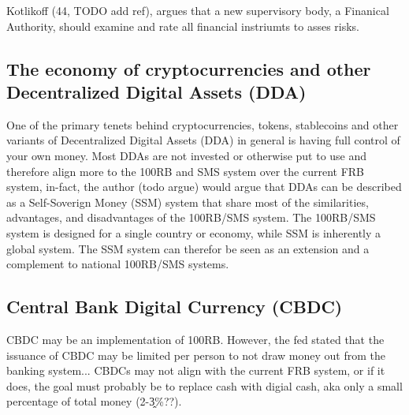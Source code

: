 Kotlikoff (44, TODO add ref), argues that a new supervisory body, a Finanical Authority, should examine and rate all financial instriumts to asses risks. 

\subsection{The economy of cryptocurrencies and other Decentralized Digital Assets (DDA)}
One of the primary tenets behind cryptocurrencies, tokens, stablecoins and other variants of Decentralized Digital Assets (DDA) in general is having full control of your own money. Most DDAs are not invested or otherwise put to use and therefore align more to the 100RB and SMS system over the current FRB system, in-fact, the author (todo argue) would argue that DDAs can be described as a Self-Soverign Money (SSM) system that share most of the similarities, advantages, and disadvantages of the 100RB/SMS system. The 100RB/SMS system is designed for a single country or economy, while SSM is inherently a global system. The SSM system can therefor be seen as an extension and a complement to national 100RB/SMS systems.

\subsection{Central Bank Digital Currency (CBDC)}
CBDC may be an implementation of 100RB. However, the fed stated that the issuance of CBDC may be limited per person to not draw money out from the banking system... CBDCs may not align with the current FRB system, or if it does, the goal must probably be to replace cash with digial cash, aka only a small percentage of total money (2-3̭\%??). 